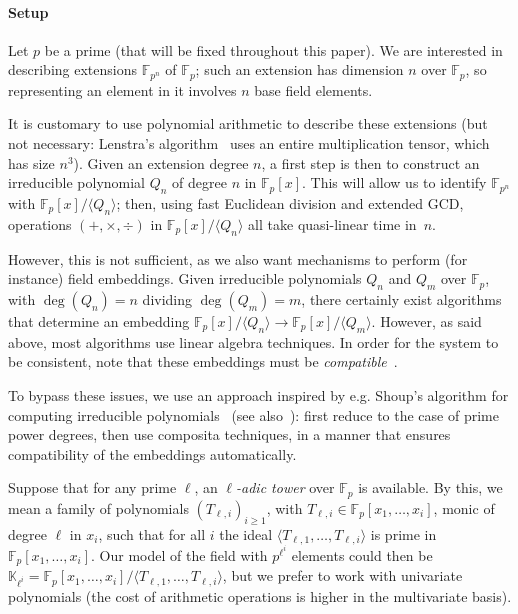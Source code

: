 \documentclass{sig-alternate}
\def\F {\ensuremath{\mathbb{F}}}
\def\K {\ensuremath{\mathbb{K}}}
\newcounter{algo}
\newcommand{\ang}[1]{\langle#1\rangle}
\begin{document}
\paragraph*{{\bf \rm Setup}}
Let $p$ be a prime (that will be fixed throughout this paper). We are
interested in describing extensions $\F_{p^n}$ of $\F_p$; such an
extension has dimension $n$ over $\F_p$, so representing an element in
it involves $n$ base field elements.

It is customary to use polynomial arithmetic to describe these
extensions (but not necessary: Lenstra's algorithm~\cite{LenstraJr91}
uses an entire multiplication tensor, which has size $n^3$). Given an
extension degree $n$, a first step is then to construct an irreducible
polynomial $Q_n$ of degree $n$ in $\F_p[x]$. This will allow us to
identify $\F_{p^n}$ with $\F_p[x]/\ang{Q_n}$; then, using fast
Euclidean division and extended GCD, operations $(+,\times,\div)$ in
$\F_p[x]/\ang{Q_n}$ all take quasi-linear time in~$n$.

However, this is not sufficient, as we also want mechanisms to perform
(for instance) field embeddings. Given irreducible polynomials $Q_n$
and $Q_m$ over $\F_p$, with $\deg(Q_n)=n$ dividing $\deg(Q_m)=m$,
there certainly exist algorithms that determine an embedding
$\F_p[x]/\ang{Q_n} \to \F_p[x]/\ang{Q_m}$. However, as said above,
most algorithms use linear algebra techniques. In order for the system
to be consistent, note that these embeddings must be {\em
  compatible}~\cite{bosma+cannon+steel97}.

To bypass these issues, we use an approach inspired by e.g. Shoup's
algorithm for computing irreducible polynomials~\cite{Shoup90,shoup94}
(see also~\cite{couveignes+lercier11,lenstra+desmit08-stdmodels}):
first reduce to the case of prime power degrees, then use composita
techniques, in a manner that ensures compatibility of the embeddings
automatically.

\smallskip{}
Suppose that for any prime $\ell$, an {\em $\ell$-adic tower} over
$\F_p$ is available. By this, we mean a family of polynomials
$(T_{\ell,i})_{i \ge 1}$, with $T_{\ell,i} \in \F_p[x_1,\dots,x_i]$,
monic of degree $\ell$ in $x_i$, such that for all $i$ the ideal
$\ang{T_{\ell,1},\dots,T_{\ell,i}}$ is prime in $\F_p[x_1,\dots,x_i]$.
Our model of the field with $p^{\ell^i}$ elements could then
be
$\K_{\ell^i}=\F_p[x_1,\dots,x_i]/\ang{T_{\ell,1},\dots,T_{\ell,i}}$,
but we prefer to work with univariate polynomials (the cost of
arithmetic operations is higher in the multivariate basis).  
\end{document}
